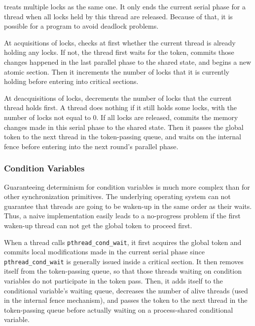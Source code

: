 \dthreads{} treats multiple locks as the same one. It only ends the current serial phase for a thread when all locks held by this thread are released. Because of that, it is possible for a program to avoid deadlock problems. 

At acquisitions of locks, \dthreads{} checks at first whether the current thread is already holding any locks. If not, the thread first waits for the token, commits those changes happened in the last parallel phase to the shared state, and begins a new atomic section. Then it increments the number of locks that it is currently holding before entering into critical sections. 

At deacquisitions of locks, \dthreads{} decrements the number of locks that the current thread holds first. A thread does nothing if it still holds some locks, with the number of locks not equal to 0. If all locks are released, \dthreads{} commits the memory changes made in this serial phase to the shared state. Then it passes the global token to the next thread in the token-passing queue, and waits on the internal fence before entering into the next round's parallel phase.

\subsubsection{Condition Variables}
\label{sec:condwait}

Guaranteeing determinism for condition variables is much more complex than for other synchronization primitives. The underlying operating system can not guarantee that threads are going to be waken-up in the same order as their waits. Thus, a naive implementation easily leads to a no-progress problem if the first waken-up thread can not get the global token to proceed first.

When a thread calls \texttt{pthread\_cond\_wait}, it first acquires the global token and commits local modifications made in the current serial phase since \texttt{pthread\_cond\_wait} is generally issued inside a critical section. It then removes itself from the token-passing queue, so that those threads waiting on condition variables do not participate in the token pass. Then, it adds itself to the conditional variable's waiting queue, decreases the number of alive threads (used in the internal fence mechanism), and passes the token to the next thread in the token-passing queue before actually waiting on a process-shared conditional variable. 

